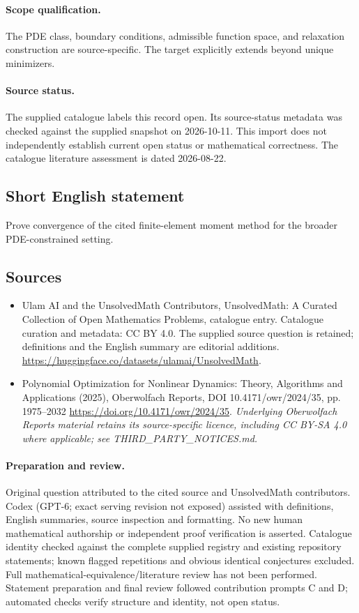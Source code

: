 \documentclass[11pt]{article}
\begin{document}
\paragraph{Scope qualification.}
The PDE class, boundary conditions, admissible function space, and relaxation construction are source-specific. The target explicitly extends beyond unique minimizers.
\paragraph{Source status.}
The supplied catalogue labels this record open. Its source-status metadata was checked against the supplied snapshot on 2026-10-11. This import does not independently establish current open status or mathematical correctness. The catalogue literature assessment is dated 2026-08-22.
\subsection{Short English statement}
Prove convergence of the cited finite-element moment method for the broader PDE-constrained setting.
\subsection{Sources}
\begin{itemize}
\item[S1] Ulam AI and the UnsolvedMath Contributors, UnsolvedMath: A Curated Collection of Open Mathematics Problems, catalogue entry. Catalogue curation and metadata: CC BY 4.0. The supplied source question is retained; definitions and the English summary are editorial additions.
\url{https://huggingface.co/datasets/ulamai/UnsolvedMath}.
\item[S2] Polynomial Optimization for Nonlinear Dynamics: Theory, Algorithms and Applications (2025), Oberwolfach Reports, DOI 10.4171/owr/2024/35, pp. 1975--2032
\url{https://doi.org/10.4171/owr/2024/35}.
\textit{Underlying Oberwolfach Reports material retains its source-specific licence, including CC BY-SA 4.0 where applicable; see THIRD\_PARTY\_NOTICES.md.}
\end{itemize}
\paragraph{Preparation and review.}
Original question attributed to the cited source and UnsolvedMath contributors. Codex (GPT-6; exact serving revision not exposed) assisted with definitions, English summaries, source inspection and formatting. No new human mathematical authorship or independent proof verification is asserted. Catalogue identity checked against the complete supplied registry and existing repository statements; known flagged repetitions and obvious identical conjectures excluded. Full mathematical-equivalence/literature review has not been performed. Statement preparation and final review followed contribution prompts C and D; automated checks verify structure and identity, not open status.
\label{end:statement}
\end{document}
